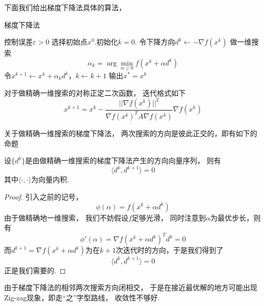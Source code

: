 下面我们给出梯度下降法具体的算法，
\begin{algorithm}[H]
\caption{梯度下降法}%
\begin{algorithmic}[1]%
\Require 控制误差$\varepsilon > 0$
\State 选择初始点$x^0$.初始化$k = 0$.
\State 令下降方向$d^k\leftarrow -\nabla f(x^k)$
\State 做一维搜索
\begin{equation*}
	\alpha_k = \arg\min_{\alpha\geq 0} f(x^k + \alpha d^k)
\end{equation*}
\State 令$x^{k+1}\leftarrow x^k + \alpha_k d^k$，$k\leftarrow k+1$
\EndWhile
\State 输出$x^* = x^k$
\end{algorithmic}  
\end{algorithm}
\begin{note}
	对于做精确一维搜索的对称正定二次函数， 迭代格式如下
	\begin{equation*}
		x^{k+1} = x^k - \frac{||\nabla f(x^k)||^2}{\nabla f(x^k)^T A \nabla f(x^k)} \nabla f(x^k)
	\end{equation*}
\end{note}
关于做精确一维搜索的梯度下降法， 两次搜索的方向是彼此正交的，即有如下的命题
\begin{proposition}
	设$\{d^k\}$是由做精确一维搜索的梯度下降法产生的方向向量序列， 则有
	\begin{equation*}
		\langle d^k, d^{k+1}\rangle = 0 
	\end{equation*}
	其中$\langle \cdot, \cdot \rangle$为向量内积.
\end{proposition}
\begin{proof}
	引入之前的记号，
	\begin{equation*}
		\phi(\alpha) = f(x^k + \alpha d^k)
	\end{equation*}
	由于做精确地一维搜索， 我们不妨假设$f$足够光滑， 同时注意到$\alpha$为最优步长，则有
	\begin{equation*}
		\phi'(\alpha) = \nabla f(x^k + \alpha d^k)^T d^k = 0
	\end{equation*}
	而$d^{k+1} = \nabla f(x^k + \alpha d^k)$为在$k+1$次迭代时的方向，于是我们得到了
	\begin{equation*}
		\langle d^k, d^{k+1}\rangle = 0 
	\end{equation*}
	正是我们需要的.
\end{proof}
\begin{note}
	由于梯度下降法的相邻两次搜索方向闭相交， 于是在接近最优解的地方可能出现Zig-zag现象，即走“之”字型路线， 收敛性不够好.
\end{note}
